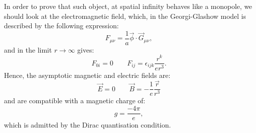 \documentclass[main.tex]{subfiles}
\begin{document}
In order to prove that such object, at spatial infinity behaves like a monopole, we should look at the electromagnetic field, which, in the Georgi-Glashow model is described by the following expression: 
\begin{equation}
 F_{\mu \nu} = \frac{1}{a} \vec{\phi} \cdot \vec{G}_{\mu \nu },
\end{equation}
and in the limit $r \to \infty$  gives:
\begin{equation}
F_{0i}= 0 \qquad F_{ij}= \epsilon_{ijk} \frac{r^k}{e r^3}.
\end{equation}
Hence, the asymptotic magnetic and electric fields are: 
\begin{equation}
\vec{E}=0 \qquad  \vec{B}= - \frac{1}{e} \frac{\vec{r}}{r^3}
\end{equation}
and are compatible with a magnetic charge of: 
\begin{equation}
g= \frac{-4\pi}{e},
\end{equation}
which is admitted by the Dirac quantisation condition.

\end{document}
